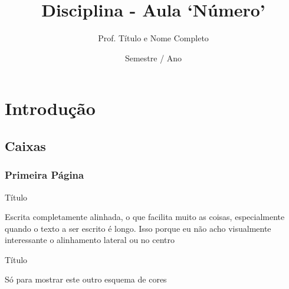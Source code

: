 \documentclass[dvipdfmx]{beamer}
\title{Disciplina - Aula `N\'umero' }
\author[Prof. Seu Nome - ]{Prof. T\'itulo e Nome Completo}
\institute[Curso]{UNIVERSIDADE FEDERAL DO PAMPA - UNIPAMPA, Campus Nome da Cidade}
\date{Semestre / Ano}
\newcommand{\texto}[1]{\begin{minipage}{\textwidth} #1 \end{minipage}}
\begin{document}
\begin{frame}
\titlepage
\end{frame}


\section{Introdução}
\subsection{Caixas}

\begin{frame}
\frametitle{Primeira Página}

\begin{block}{Título}
 \texto{Escrita completamente alinhada, o que facilita muito as coisas, especialmente quando o texto a ser escrito é longo. Isso porque eu não acho visualmente interessante o alinhamento lateral ou no centro}
\end{block}
\pause

\begin{exampleblock}{Título}
 \texto{Só para mostrar este outro esquema de cores}
\end{exampleblock}


\end{frame}

\end{document}
